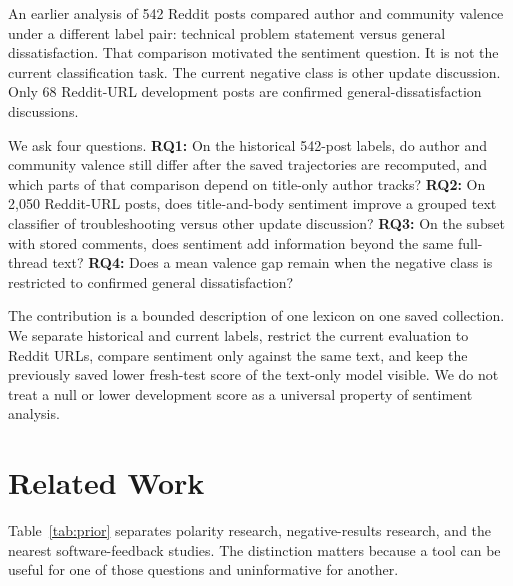 \documentclass[conference,letterpaper]{IEEEtran}
\begin{document}
An earlier analysis of 542 Reddit posts compared author and community valence under a different label pair: technical problem statement versus general dissatisfaction. That comparison motivated the sentiment question. It is not the current classification task. The current negative class is other update discussion. Only 68 Reddit-URL development posts are confirmed general-dissatisfaction discussions.

We ask four questions. \textbf{RQ1:} On the historical 542-post labels, do author and community valence still differ after the saved trajectories are recomputed, and which parts of that comparison depend on title-only author tracks? \textbf{RQ2:} On 2,050 Reddit-URL posts, does title-and-body sentiment improve a grouped text classifier of troubleshooting versus other update discussion? \textbf{RQ3:} On the subset with stored comments, does sentiment add information beyond the same full-thread text? \textbf{RQ4:} Does a mean valence gap remain when the negative class is restricted to confirmed general dissatisfaction?

The contribution is a bounded description of one lexicon on one saved collection. We separate historical and current labels, restrict the current evaluation to Reddit URLs, compare sentiment only against the same text, and keep the previously saved lower fresh-test score of the text-only model visible. We do not treat a null or lower development score as a universal property of sentiment analysis.

\section{Related Work}
Table~\ref{tab:prior} separates polarity research, negative-results research, and the nearest software-feedback studies. The distinction matters because a tool can be useful for one of those questions and uninformative for another.
\end{document}
